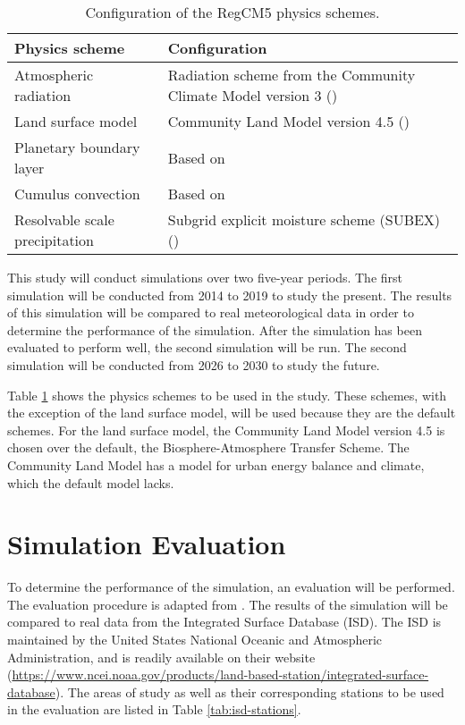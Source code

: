 	\begin{table}	
		\caption{Configuration of the RegCM5 physics schemes.}
		\label{tab:physics-schemes}
		\centering
		\begin{tabular}{p{2 in} p{2.75 in}}
			\hline \hline
			Physics scheme & Configuration\\
			\hline
			Atmospheric radiation & Radiation scheme from the Community Climate Model version 3 (\cite{Kiehl1996}) \\
			Land surface model & Community Land Model version 4.5 (\cite{Oleson2013})\\
			Planetary boundary layer & Based on \textcite{Holtslag1990}\\
			Cumulus convection & Based on \textcite{Emanuel1991}\\
			Resolvable scale precipitation & Subgrid explicit moisture scheme (SUBEX) (\cite{Pal2000})\\
			\hline
		\end{tabular}		
	\end{table}

	This study will conduct simulations over two five-year periods.
	The first simulation will be conducted from 2014 to 2019 to study the present.
	The results of this simulation will be compared to real meteorological data in order to determine the performance of the simulation.
	After the simulation has been evaluated to perform well, the second simulation will be run.
	The second simulation will be conducted from 2026 to 2030 to study the future.
	
	Table \ref{tab:physics-schemes} shows the physics schemes to be used in the study.
	These schemes, with the exception of the land surface model, will be used because they are the default schemes. 
	For the land surface model, the Community Land Model version 4.5 is chosen over the default, the Biosphere-Atmosphere Transfer Scheme. 
	The Community Land Model has a model for urban energy balance and climate, which the default model lacks.
	
\section{Simulation Evaluation}
	To determine the performance of the simulation, an evaluation will be performed. The evaluation procedure is adapted from \textcite{Bilang2022}.
	The results of the simulation will be compared to real data from the Integrated Surface Database (ISD).
	The ISD is maintained by the United States National Oceanic and Atmospheric Administration, and is readily available on their website 
		(\url{https://www.ncei.noaa.gov/products/land-based-station/integrated-surface-database}).
	The areas of study as well as their corresponding stations to be used in the evaluation are listed in Table \ref{tab:isd-stations}.

